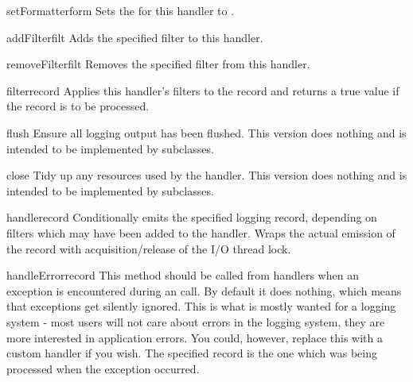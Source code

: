 \begin{methoddesc}{setFormatter}{form}
Sets the  for this handler to .
\end{methoddesc}

\begin{methoddesc}{addFilter}{filt}
Adds the specified filter  to this handler.
\end{methoddesc}

\begin{methoddesc}{removeFilter}{filt}
Removes the specified filter  from this handler.
\end{methoddesc}

\begin{methoddesc}{filter}{record}
Applies this handler's filters to the record and returns a true value if
the record is to be processed.
\end{methoddesc}

\begin{methoddesc}{flush}{}
Ensure all logging output has been flushed. This version does
nothing and is intended to be implemented by subclasses.
\end{methoddesc}

\begin{methoddesc}{close}{}
Tidy up any resources used by the handler. This version does
nothing and is intended to be implemented by subclasses.
\end{methoddesc}

\begin{methoddesc}{handle}{record}
Conditionally emits the specified logging record, depending on
filters which may have been added to the handler. Wraps the actual
emission of the record with acquisition/release of the I/O thread
lock.
\end{methoddesc}

\begin{methoddesc}{handleError}{record}
This method should be called from handlers when an exception is
encountered during an  call. By default it does nothing,
which means that exceptions get silently ignored. This is what is
mostly wanted for a logging system - most users will not care
about errors in the logging system, they are more interested in
application errors. You could, however, replace this with a custom
handler if you wish. The specified record is the one which was being
processed when the exception occurred.
\end{methoddesc}

